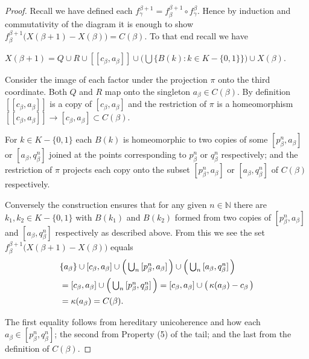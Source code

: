 \documentclass[12pt]{article}
\theoremstyle{plain}
\theoremstyle{definition}
\newcommand{\K}{\ensuremath{\kappa}}
\newcommand{\B}{\ensuremath{\beta}}
\newcommand{\G}{\ensuremath{\gamma}}
\newcommand{\NN}{\ensuremath{\mathbb N}}
\newcommand{\0}{\ensuremath{\varnothing}}
\begin{document}
	
	\begin{proof}
		
		Recall we have defined each $f^{\B+1}_\G = f^{\B+1}_\B  \circ f^{\B}_\G $. Hence by induction and commutativity of the diagram it is enough to show $f^{\B+1}_\B\big (X(\B+1) - X(\B) \big ) = C(\B)$. To that end recall we have
		
		\begin{center}
			$ X(\B+1) = Q \cup R \cup [[c_\B,a_\B]] \cup \Big ( \bigcup \big \{B(k):k \in K - \{0,1\} \big \}  \Big ) \cup X(\B)$.
		\end{center}
		
		Consider the image of each factor under the projection $\pi$ onto the third coordinate. 
		Both $Q$ and $R$ map onto the singleton $a_\B \in C(\B)$. By definition $[[c_\B,a_\B]]$ is a copy of $[c_\B,a_\B]$ and the restriction of $\pi$ is a homeomorphism $[[c_\B,a_\B]] \to [c_\B,a_\B] \subset C(\B)$. 
		
		For $k \in K - \{0,1\}$ each $B(k)$ is homeomorphic to two copies of some $[p^n_\B, a_\B] $ or $[a_\B, q^n_\B]$ joined at the points corresponding to $p^n_\B$ or $q^n_\B$ respectively; and the restriction of $\pi$ projects each copy onto the subset $[p^n_\B, a_\B] $ or $[a_\B, q^n_\B]$ of $C(\B)$ respectively.
		
		Conversely the construction ensures that for any given $n \in \NN$ there are $k_1,k_2 \in K - \{0,1\}$ with $B(k_1)$ and $B(k_2)$ formed from two copies of $[p^n_\B, a_\B] $ and $[a_\B, q^n_\B]$ respectively as described above. From this we see the set $f^{\B+1}_\B\big (X(\B+1) - X(\B) \big )$ equals
		\begin{align}\notag 
		&\textstyle \{a_\B\} \cup [c_\B,a_\B] \cup \Big ( \bigcup_n \,  [p^n_\B, a_\B ] \, \Big ) \cup \Big ( \bigcup_n \, [a_\B,q^n_\B ] \, \Big ) \\
		&\textstyle = \notag [c_\B,a_\B] \cup \Big ( \bigcup_n \, [p^n_\B,q^n_\B ] \, \Big ) = \notag [c_\B,a_\B] \cup \big (\, \K(a_\B) - c_\B\, \big )\\
		&= \notag \K(a_\B) = C(\B).
		\end{align}
		
		The first equality follows from hereditary unicoherence and how each \mbox{$a_\B \in [p^n_\B,q^n_\B ]$}; the second from Property (5) of the tail; and the last from the definition of $C(\B)$.
	\end{proof}
	
	
\end{document}

